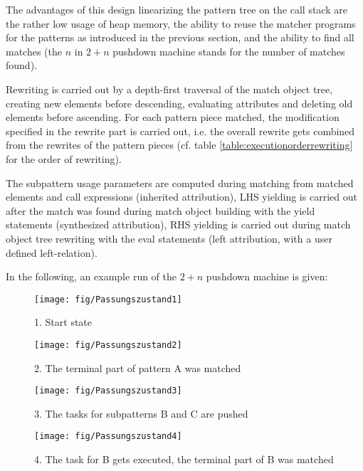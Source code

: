 The advantages of this design linearizing the pattern tree on the call stack are the rather low usage of heap memory, the ability to reuse the matcher programs for the patterns as introduced in the previous section, and the ability to find all matches (the $n$ in $2+n$ pushdown machine stands for the number of matches found).

Rewriting is carried out by a depth-first traversal of the match object tree, creating new elements before descending, evaluating attributes and deleting old elements before ascending. 
For each pattern piece matched, the modification specified in the rewrite part is carried out, i.e. the overall rewrite gets combined from the rewrites of the pattern pieces (cf. table \ref{table:executionorderrewriting} for the order of rewriting).

The subpattern usage parameters are computed during matching from matched elements and call expressions (inherited attribution), LHS yielding is carried out after the match was found during match object building with the yield statements (synthesized attribution), RHS yielding is carried out during match object tree rewriting with the eval statements (left attribution, with a user defined left-relation).

In the following, an example run of the $2+n$ pushdown machine is given:

\vspace{16cm} %

\begin{figure}[htbp]
  \centering
  \texttt{[image: fig/Passungszustand1]}
  \caption{1. Start state}
  \label{figmatchingstate1}
\end{figure}

\begin{figure}[htbp]
  \centering
  \texttt{[image: fig/Passungszustand2]}
  \caption{2. The terminal part of pattern A was matched}
  \label{figmatchingstate2}
\end{figure}

\begin{figure}[htbp]
  \centering
  \texttt{[image: fig/Passungszustand3]}
  \caption{3. The tasks for subpatterns B and C are pushed}
  \label{figmatchingstate3}
\end{figure}

\begin{figure}[htbp]
  \centering
  \texttt{[image: fig/Passungszustand4]}
  \caption{4. The task for B gets executed, the terminal part of B was matched}
  \label{figmatchingstate4}
\end{figure}

